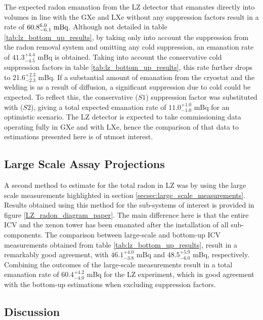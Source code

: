 The expected radon emanation from the LZ detector that emanates directly into volumes in line with the GXe and LXe without any suppression factors result in a rate of $60.8^{6.0}_{-6.1} \;  \text{mBq}$. Although not detailed in table \ref{tab:lz_bottom_up_results}, by taking only into account the suppression from the radon removal system and omitting any cold suppression, an emanation rate of $41.3^{+4.4}_{-4.5}$ mBq is obtained. Taking into account the conservative cold suppression factors in table \ref{tab:lz_bottom_up_results}, this rate further drops to $21.6^{+2.3}_{-2.3}$ mBq. If a substantial amount of emanation from the cryostat and the welding is as a result of diffusion, a significant suppression due to cold could be expected. To reflect this, the conservative ($S1$) suppression factor was substituted with ($S2$), giving a total expected emanation rate of $11.0^{+1.0}_{-1.0}$ mBq for an optimistic scenario. The LZ detector is expected to take commissioning data operating fully in GXe and with LXe, hence the comparison of that data to estimations presented here is of utmost interest.

\subsection{Large Scale Assay Projections}

A second method to estimate for the total radon in LZ was by using the large scale measurements highlighted in section \ref{secsec:large_scale_measurements}. Results obtained using this method for the sub-systems of interest is provided in figure \ref{LZ_radon_diagram_paper}. The main difference here is that the entire ICV and the xenon tower has been emanated after the installation of all sub-components. The comparison between large-scale and bottom-up ICV measurements obtained from table \ref{tab:lz_bottom_up_results}, result in a remarkably good agreement, with $46.1^{+4.0}_{-3.8}$ mBq and $48.5^{+5.9}_{-6.0}$ mBq, respectively. Combining the outcomes of the large-scale measurements result in a total emanation rate of $60.4^{+4.2}_{-4.0}$ mBq for the LZ experiment, which in good agreement with the bottom-up estimations when excluding suppression factors.


\subsection{Discussion}
\label{secsec:radon_discussion}

